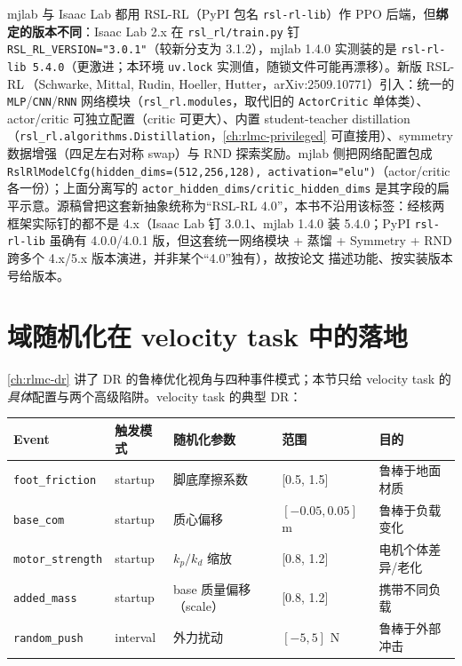 \begin{note}
mjlab 与 Isaac Lab 都用 RSL-RL（PyPI 包名 \verb|rsl-rl-lib|）作 PPO 后端，但\textbf{绑定的版本不同}：Isaac Lab 2.x 在 \verb|rsl_rl/train.py| 钉 \verb|RSL_RL_VERSION="3.0.1"|（较新分支为 3.1.2），mjlab 1.4.0 实测装的是 \verb|rsl-rl-lib 5.4.0|（更激进；本环境 \verb|uv.lock| 实测值，随锁文件可能再漂移）。新版 RSL-RL\,\cite{schwarke2025rslrl}（Schwarke, Mittal, Rudin, Hoeller, Hutter，arXiv:2509.10771）引入：统一的 \verb|MLP|/\verb|CNN|/\verb|RNN| 网络模块（\verb|rsl_rl.modules|，取代旧的 \verb|ActorCritic| 单体类）、actor/critic 可独立配置（critic 可更大）、内置 student-teacher distillation（\verb|rsl_rl.algorithms.Distillation|，\cref{ch:rlmc-privileged} 可直接用）、symmetry 数据增强（四足左右对称 swap）与 RND 探索奖励。mjlab 侧把网络配置包成 \verb|RslRlModelCfg(hidden_dims=(512,256,128), activation="elu")|（actor/critic 各一份）；上面分离写的 \verb|actor_hidden_dims/critic_hidden_dims| 是其字段的扁平示意。源稿曾把这套新抽象统称为“RSL-RL 4.0”，本书不沿用该标签：经核两框架实际钉的都不是 4.x（Isaac Lab 钉 3.0.1、mjlab 1.4.0 装 5.4.0；PyPI \texttt{rsl-rl-lib} 虽确有 4.0.0/4.0.1 版，但这套统一网络模块 + 蒸馏 + Symmetry + RND 跨多个 4.x/5.x 版本演进，并非某个“4.0”独有），故按论文 \cite{schwarke2025rslrl} 描述功能、按实装版本号给版本。
\end{note}

\section{域随机化在 velocity task 中的落地}
\label{sec:rlmc-ql-dr}

\cref{ch:rlmc-dr} 讲了 DR 的鲁棒优化视角与四种事件模式；本节只给 velocity task 的\emph{具体}配置与两个高级陷阱。velocity task 的典型 DR：

\begin{center}
\small
\begin{tabular}{@{}lllll@{}}
\toprule
Event & 触发模式 & 随机化参数 & 范围 & 目的 \\
\midrule
\verb|foot_friction| & startup & 脚底摩擦系数 & [0.5, 1.5] & 鲁棒于地面材质 \\
\verb|base_com| & startup & 质心偏移 & $[-0.05,0.05]$ m & 鲁棒于负载变化 \\
\verb|motor_strength| & startup & $k_p/k_d$ 缩放 & [0.8, 1.2] & 电机个体差异/老化 \\
\verb|added_mass| & startup & base 质量偏移（scale） & [0.8, 1.2] & 携带不同负载 \\
\verb|random_push| & interval & 外力扰动 & $[-5,5]$ N & 鲁棒于外部冲击 \\
\bottomrule
\end{tabular}
\end{center}

